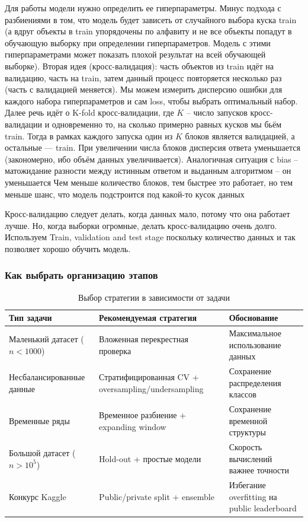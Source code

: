 Для работы модели нужно определить ее гиперпараметры.
Минус подхода с разбиениями в том, что модель будет зависеть от случайного выбора куска train (а вдруг объекты
в train упорядочены по алфавиту и не все объекты попадут в обучающую выборку при определении гиперпараметров.
Модель с этими гиперпараметрами может показать плохой результат на всей обучающей выборке).
Вторая идея (кросс-валидация): часть объектов из train идёт на валидацию, часть на train, затем данный процесс
повторяется несколько раз (часть с валидацией меняется).
Мы можем измерить дисперсию ошибки для каждого набора гиперпараметров и сам loss, чтобы выбрать оптимальный набор.
Далее речь идёт о K-fold кросс-валидации, где $K$ -- число запусков кросс-валидации и одновременно то, на сколько
примерно равных кусков мы бьём train.
Тогда в рамках каждого запуска один из $K$ блоков является валидацией, а остальные — train.
При увеличении числа блоков дисперсия ответа уменьшается (закономерно, ибо объём данных увеличивается).
Аналогичная ситуация с bias -- матожидание разности между истинным ответом и выданным алгоритмом -- он уменьшается
Чем меньше количество блоков, тем быстрее это работает, но тем меньше шанс, что модель подстроится под какой-то
кусок данных

Кросс-валидацию следует делать, когда данных мало, потому что она работает лучше.
Но, когда выборки огромные, делать кросс-валидацию очень долго.
Используем Train, validation and test stage поскольку количество данных и так позволяет хорошо обучить модель.

\subsubsection{Как выбрать организацию этапов}

\begin{table}[h]
    \centering
    \begin{tabular}{|p{}|p{}|p{}|}
        \hline
        \textbf{Тип задачи}            & \textbf{Рекомендуемая стратегия}                   & \textbf{Обоснование}                        \\\hline
        Маленький датасет ($n < 1000$) & Вложенная перекрестная проверка                    & Максимальное использование данных           \\\hline
        Несбалансированные данные      & Стратифицированная CV + oversampling/undersampling & Сохранение распределения классов            \\\hline
        Временные ряды                 & Временное разбиение + expanding window             & Сохранение временной структуры              \\\hline
        Большой датасет ($n > 10^5$)   & Hold-out + простые модели                          & Скорость вычислений важнее точности         \\\hline
        Конкурс Kaggle                 & Public/private split + ensemble                    & Избегание overfitting на public leaderboard \\\hline
    \end{tabular}
    \caption{Выбор стратегии в зависимости от задачи}
    \label{tab:stage org}
\end{table}


